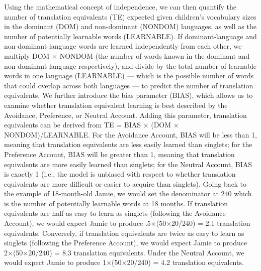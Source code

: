 \documentclass[
  english,
  ,man,floatsintext]{apa6}
\begin{document}
Using the mathematical concept of independence, we can then quantify the number of translation equivalents (TE) expected given children's vocabulary sizes in the dominant (DOM) and non-dominant (NONDOM) languages, as well as the number of potentially learnable words (LEARNABLE). If dominant-language and non-dominant-language words are learned independently from each other, we multiply DOM × NONDOM (the number of words known in the dominant and non-dominant language respectively), and divide by the total number of learnable words in one language (LEARNABLE) --- which is the possible number of words that could overlap across both languages --- to predict the number of translation equivalents. We further introduce the bias parameter (BIAS), which allows us to examine whether translation equivalent learning is best described by the Avoidance, Preference, or Neutral Account. Adding this parameter, translation equivalents can be derived from TE = BIAS × (DOM × NONDOM)/LEARNABLE. For the Avoidance Account, BIAS will be less than 1, meaning that translation equivalents are less easily learned than singlets; for the Preference Account, BIAS will be greater than 1, meaning that translation equivalents are more easily learned than singlets; for the Neutral Account, BIAS is exactly 1 (i.e., the model is unbiased with respect to whether translation equivalents are more difficult or easier to acquire than singlets). Going back to the example of 18-month-old Jamie, we would set the denominator at 240 which is the number of potentially learnable words at 18 months. If translation equivalents are half as easy to learn as singlets (following the Avoidance Account), we would expect Jamie to produce .5×(50×20/240) = 2.1 translation equivalents. Conversely, if translation equivalents are twice as easy to learn as singlets (following the Preference Account), we would expect Jamie to produce 2×(50×20/240) = 8.3 translation equivalents. Under the Neutral Account, we would expect Jamie to produce 1×(50×20/240) = 4.2 translation equivalents.
\end{document}
